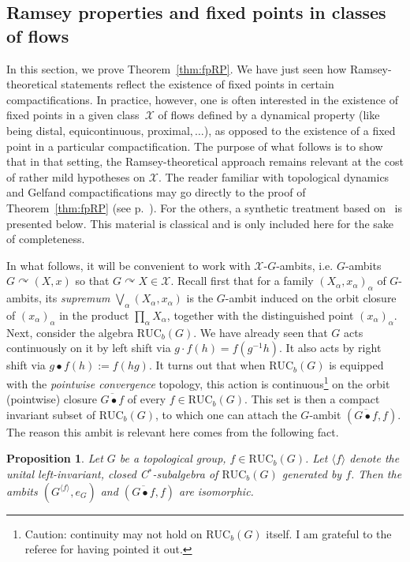 \documentclass[11pt]{article}
\newtheorem{prop}[theo]{Proposition}
\theoremstyle{definition}
\numberwithin{equation}{section}
\numberwithin{figure}{section}
\numberwithin{table}{section}
\newcommand{\actson}{\curvearrowright}
\newcommand{\RUCB}{\mathrm{RUC}_{b}}
\begin{document}
\subsection{Ramsey properties and fixed points in classes of flows}
\label{section:ambits}

In this section, we prove Theorem~\ref{thm:fpRP}. We have just seen how Ramsey-theoretical statements reflect the existence of fixed points in certain compactifications. In practice, however, one is often interested in the existence of fixed points in a given class~$\mathcal X$ of flows defined by a dynamical property (like being distal, equicontinuous, proximal$,\ldots$), as opposed to the existence of a fixed point in a particular compactification. The purpose of what follows is to show that in that setting, the Ramsey-theoretical approach remains relevant at the cost of rather mild hypotheses on $\mathcal X$. The reader familiar with topological dynamics and Gelfand compactifications may go directly to the proof of Theorem~\ref{thm:fpRP} (see p.~\pageref{proofofthm}). For the others, a synthetic treatment based on~\cite[Chapter~IV, Sections~4 and~5]{dV} is presented below. This material is classical and is only included here for the sake of completeness.


In what follows, it will be convenient to work with $\mathcal X$-$G$-ambits, i.e. $G$-ambits $G\actson(X,x)$ so that $G\actson X \in \mathcal X$. Recall first that for a family $(X_{\alpha}, x_{\alpha})_{\alpha}$ of $G$-ambits, its \emph{supremum} $\bigvee_{\alpha}(X_{\alpha},x_{\alpha})$ is the $G$-ambit induced on the orbit closure of $(x_{\alpha})_{\alpha}$ in the product $\prod_{\alpha}X_{\alpha}$, together with the distinguished point $(x_{\alpha})_{\alpha}$. Next, consider the algebra $\RUCB(G)$. We have already seen that $G$ acts continuously on it by left shift via $g\cdot f (h)=f(g^{-1}h)$. It also acts by right shift via $g\bullet f(h):=f(hg)$. It turns out that when $\RUCB(G)$ is equipped with the \emph{pointwise convergence} topology, this action is continuous\footnote{Caution: continuity may not hold on $\RUCB(G)$ itself. I am grateful to the referee for having pointed it out.} on the orbit (pointwise) closure $\overline{G\bullet f}$ of every $f\in \RUCB(G)$. This set is then a compact invariant subset of $\RUCB(G)$, to which one can attach the $G$-ambit $(\overline{G\bullet f}, f)$. The reason this ambit is relevant here comes from the following fact.

\begin{prop}\label{prop:Gelfand}
Let $G$ be a topological group, $f\in \RUCB(G)$. Let $\langle f \rangle$ denote the unital left-invariant, closed C$^{*}$-subalgebra of $\RUCB(G)$ generated by $f$. Then the ambits $(G^{\langle f \rangle},e_{G})$ and $(\overline{G\bullet f},f)$ are isomorphic.
\end{prop}
\end{document}
